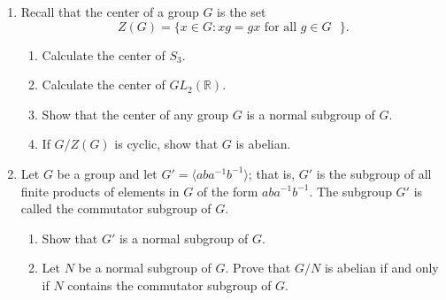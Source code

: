 {\begin{enumerate}
 
\bf\item\rm
Recall that the {\bfi center\/} of a group $G$ is
the set 
\[
Z(G) = \{ x \in G : xg = gx \mbox{ for all $g \in G$ } \}.
\]
\begin{enumerate}
 
 \bf\item\rm
Calculate the center of $S_3$.
 
 \bf\item\rm
Calculate the center of $GL_2 ( {\mathbb R} )$.
 
 \bf\item\rm
Show that the center of any group $G$ is a normal subgroup of $G$. 
 
 \bf\item\rm
If $G / Z(G)$ is cyclic, show that $G$ is abelian.
 
\end{enumerate}
 
 
 
 
\bf\item\rm
Let $G$ be a group and let $G' = \langle aba^{- 1} b^{-1} \rangle$;
that is, $G'$ is the subgroup of all finite products of elements in
$G$ of the form $aba^{-1}b^{-1}$.  The subgroup $G'$ is called the
{\bfi commutator
subgroup\/}\label{commutatorsubgroup} of $G$.  
\begin{enumerate}
 
 \bf\item\rm
Show that $G'$ is a normal subgroup of $G$.

 \bf\item\rm
Let $N$ be  a normal subgroup of $G$.  Prove that $G/N$ is abelian if
and only if $N$ contains the commutator subgroup of $G$.
 
\end{enumerate}

 
% 
% 
% 
% 
% 
% 
% 


\end{enumerate}
}
